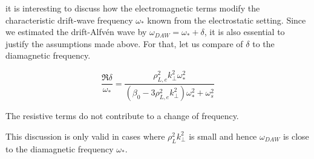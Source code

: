 %
%
%

it is interesting to discuss how the electromagnetic terms modify the characteristic drift-wave frequency $\omega_*$ known from the electrostatic setting. Since we estimated the drift-Alfvén wave by $\omega_{DAW} = \omega_* + \delta$, it is also essential to justify the assumptions made above. For that, let us compare of $\delta$ to the diamagnetic frequency. 

\begin{equation}
	\frac{\Re{\delta}}{\omega_*} = \frac{\rho_{L,e}^2k_\perp^{2} \omega_*^{2} }{\left(\beta_{0}  - 3 \rho_{L,e}^2 k_\perp^{2}\right)\omega_*^{2} + \omega_s^{2} }
\end{equation}

The resistive terms do not contribute to a change of frequency. 

This discussion is only valid in cases where $\rho_L^2k_\perp^2$ is small and hence $\omega_{DAW}$ is close to the diamagnetic frequency $\omega_*$. 




